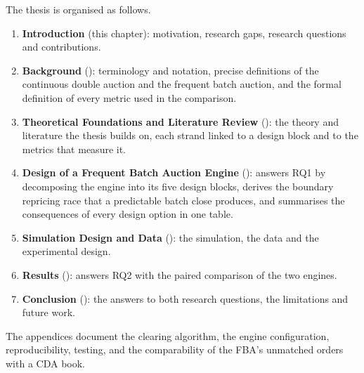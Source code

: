 The thesis is organised as follows.

\begin{enumerate}
  \item \textbf{Introduction} (this chapter): motivation, research gaps,
  research questions and contributions.
  \item \textbf{Background} (): terminology and
  notation, precise definitions of the continuous double auction and the
  frequent batch auction, and the formal definition of every metric used in
  the comparison.
  \item \textbf{Theoretical Foundations and Literature Review}
  (): the theory and literature the thesis builds on,
  each strand linked to a design block and to the metrics that measure it.
  \item \textbf{Design of a Frequent Batch Auction Engine}
  (): answers RQ1 by decomposing the engine into its five
  design blocks, derives the boundary repricing race that a predictable
  batch close produces, and summarises the consequences of every design
  option in one table.
  \item \textbf{Simulation Design and Data} (): the
  simulation, the data and the experimental design.
  \item \textbf{Results} (): answers RQ2 with the paired
  comparison of the two engines.
  \item \textbf{Conclusion} (): the answers to both
  research questions, the limitations and future work.
\end{enumerate}

The appendices document the clearing algorithm, the engine configuration,
reproducibility, testing, and the comparability of the FBA's unmatched
orders with a CDA book.
